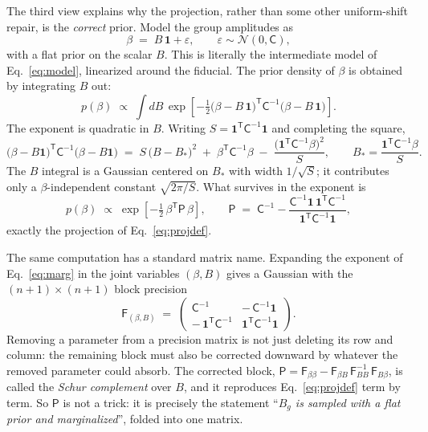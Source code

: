 \documentclass[11pt]{article}
\newcommand{\ones}{\mathbf{1}} %
\newcommand{\Cov}{\mathsf{C}}
\newcommand{\Prec}{\mathsf{P}}
\newcommand{\T}{^{\mathsf{T}}}
\begin{document}
The third view explains why the projection, rather than some other
uniform-shift repair, is the \emph{correct} prior.  Model the group
amplitudes as
\begin{equation}
  \beta \;=\; B\,\ones + \varepsilon,
  \qquad
  \varepsilon \sim \mathcal{N}(0, \Cov),
  \label{eq:genmodel}
\end{equation}
with a flat prior on the scalar $B$.  This is literally the
intermediate model of Eq.~\eqref{eq:model}, linearized around the
fiducial.  The prior density of $\beta$ is obtained by integrating $B$
out:
\begin{equation}
  p(\beta) \;\propto\;
  \int dB\,
  \exp\!\left[
    -\tfrac{1}{2}
    \bigl(\beta - B\,\ones\bigr)\T \Cov^{-1} \bigl(\beta - B\,\ones\bigr)
  \right].
  \label{eq:marg}
\end{equation}
The exponent is quadratic in $B$.  Writing
$S = \ones\T \Cov^{-1} \ones$ and completing the square,
\begin{equation}
  \bigl(\beta - B\ones\bigr)\T \Cov^{-1} \bigl(\beta - B\ones\bigr)
  \;=\;
  S\,\bigl(B - B_*\bigr)^2
  \;+\;
  \beta\T \Cov^{-1} \beta
  \;-\;
  \frac{\bigl(\ones\T \Cov^{-1} \beta\bigr)^2}{S},
  \qquad
  B_* = \frac{\ones\T \Cov^{-1} \beta}{S} .
  \label{eq:complsq}
\end{equation}
The $B$ integral is a Gaussian centered on $B_*$ with width
$1/\sqrt{S}$; it contributes only a $\beta$-independent constant
$\sqrt{2\pi / S}$.  What survives in the exponent is
\begin{equation}
  p(\beta) \;\propto\;
  \exp\!\left[-\tfrac{1}{2}\, \beta\T \Prec\, \beta\right],
  \qquad
  \Prec \;=\; \Cov^{-1}
  - \frac{\Cov^{-1}\ones\,\ones\T \Cov^{-1}}{\ones\T \Cov^{-1} \ones},
  \label{eq:margresult}
\end{equation}
exactly the projection of Eq.~\eqref{eq:projdef}.

The same computation has a standard matrix name.  Expanding the
exponent of Eq.~\eqref{eq:marg} in the joint variables $(\beta, B)$
gives a Gaussian with the $(n+1) \times (n+1)$ block precision
\begin{equation}
  \mathsf{F}_{(\beta, B)}
  \;=\;
  \begin{pmatrix}
    \Cov^{-1} & -\,\Cov^{-1}\ones \\[0.4ex]
    -\,\ones\T \Cov^{-1} & \ones\T \Cov^{-1} \ones
  \end{pmatrix}.
  \label{eq:jointprec}
\end{equation}
Removing a parameter from a precision matrix is not just deleting its
row and column: the remaining block must also be corrected downward by
whatever the removed parameter could absorb.  The corrected block,
$\Prec = \mathsf{F}_{\beta\beta}
- \mathsf{F}_{\beta B}\, \mathsf{F}_{BB}^{-1}\, \mathsf{F}_{B\beta}$,
is called the \emph{Schur complement} over $B$, and it reproduces
Eq.~\eqref{eq:projdef} term by term.  So $\Prec$ is not a trick: it
is precisely the statement ``\emph{$B_g$ is sampled with a flat prior
and marginalized}'', folded into one matrix.
\end{document}
